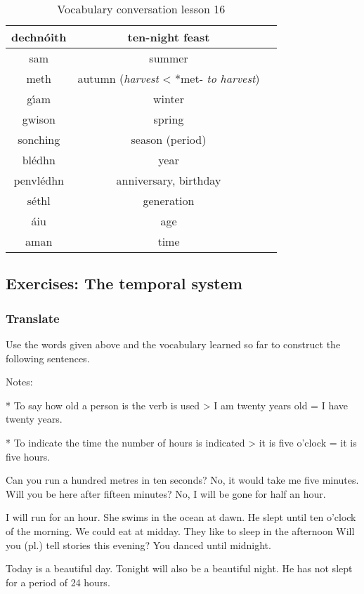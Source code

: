 \begin{table}[H]
\begin{tabular}{ccc}
  dechn\'{o}ith & ten-night feast & \\
  \midrule
  sam & summer & \\
  meth & autumn (\textit{harvest} < *met- \textit{to harvest})\\
  g\'{\i}am & winter & \\
  gwison & spring & \\
  \midrule
  sonching & season (period) & \\
  bl\'{e}dhn & year & \\
  penvl\'{e}dhn & anniversary, birthday & \\
  \midrule
  s\'{e}thl & generation & \\
  \'{a}iu & age & \\
  aman & time & \\
  \bottomrule
\end{tabular}
\label{vocab_conversation_lesson16}
\caption{Vocabulary conversation lesson 16}
\end{table}

\subsection{Exercises: The temporal system}

\subsubsection{Translate}

Use the words given above and the vocabulary learned so far to construct the following sentences.

Notes: 

* To say how old a person is the verb  is used
> I am twenty years old = I have twenty years.

* To indicate the time the number of hours is indicated
> it is five o’clock = it is five hours.

Can you run a hundred metres in ten seconds?
No, it would take me five minutes.
Will you be here after fifteen minutes?
No, I will be gone for half an hour.

I will run for an hour.
She swims in the ocean at dawn.
He slept until ten o’clock of the morning.
We could eat at midday.
They like to sleep in the afternoon
Will you (pl.) tell stories this evening?
You danced until midnight.

Today is a beautiful day.
Tonight will also be a beautiful night.
He has not slept for a period of 24 hours.

